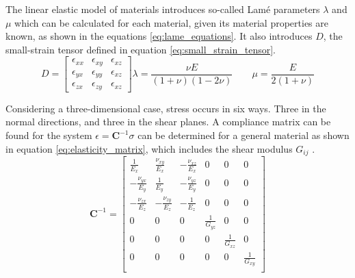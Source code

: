 The linear elastic model of materials introduces so-called Lam\'{e} parameters $\lambda$ and $\mu$ which can be calculated for each material, given its material properties are known, as shown in the equations \ref{eq:lame_equations}. It also introduces $D$, the small-strain tensor defined in equation \ref{eq:small_strain_tensor}.
\begin{subequations}
	\begin{equation}
		D =
		\begin{bmatrix}
			\epsilon_{xx} & \epsilon_{xy}  & \epsilon_{xz} \\
			\epsilon_{yx} & \epsilon_{yy}  & \epsilon_{xz} \\
			\epsilon_{zx} & \epsilon_{zy}  & \epsilon_{xz}
		\end{bmatrix}
		\label{eq:small_strain_tensor}
	\end{equation}
	\begin{equation}
		\lambda = \frac{\nu E}{(1+\nu)(1-2\nu)} \qquad \mu = \frac{E}{2(1+\nu)}
		\label{eq:lame_equations}
	\end{equation}
\end{subequations}

Considering a three-dimensional case, stress occurs in six ways. Three in the normal directions, and three in the shear planes. A compliance matrix can be found for the system $\epsilon=\mathbf{C}^{-1}\sigma$ can be determined for a general material as shown in equation \ref{eq:elasticity_matrix}, which includes the shear modulus $G_{ij}$ \cite{Lubliner_Papadopoulos_2014}.
\begin{equation}
	\mathbf{C}^{-1}=\begin{bmatrix}
		\frac{1}{E_x} & \frac{\nu_{xy}}{E_x} & -\frac{\nu_{xz}}{E_x} & 0 & 0 & 0 \\
		-\frac{\nu_{yx}}{E_y} & \frac{1}{E_y} & -\frac{\nu_{yz}}{E_y} & 0 & 0 & 0 \\
		-\frac{\nu_{zx}}{E_z} & -\frac{\nu_{zy}}{E_z} & -\frac{1}{E_z} & 0 & 0 & 0 \\
		0 & 0 & 0 & \frac{1}{G_{yz}} & 0 & 0 \\
		0 & 0 & 0 & 0 & \frac{1}{G_{xz}} & 0 \\
		0 & 0 & 0 & 0 & 0 & \frac{1}{G_{xy}} \\
	\end{bmatrix}
	\label{eq:elasticity_matrix}
\end{equation}

